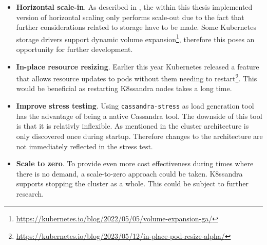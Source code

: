 \begin{itemize}
    \item \textbf{Horizontal scale-in}. As described in , the within this thesis implemented version of horizontal scaling only performs scale-out due to the fact that further considerations related to storage have to be made. Some Kubernetes storage drivers support dynamic volume expansion\footnote{\url{https://kubernetes.io/blog/2022/05/05/volume-expansion-ga/}}, therefore this poses an opportunity for further development.

    \item \textbf{In-place resource resizing}. Earlier this year Kubernetes released a feature that allows resource updates to pods without them needing to restart\footnote{\url{https://kubernetes.io/blog/2023/05/12/in-place-pod-resize-alpha/}}. This would be beneficial as restarting K8ssandra nodes takes a long time.

    \item \textbf{Improve stress testing}. Using \texttt{cassandra-stress} as load generation tool has the advantage of being a native Cassandra tool. The downside of this tool is that it is relativly inflexible. As mentioned in  the cluster architecture is only discovered once during startup. Therefore changes to the architecture are not immediately reflected in the stress test.

    \item \textbf{Scale to zero}. To provide even more cost effectiveness during times where there is no demand, a scale-to-zero approach could be taken. K8ssandra supports stopping the cluster as a whole. This could be subject to further research.
\end{itemize}
